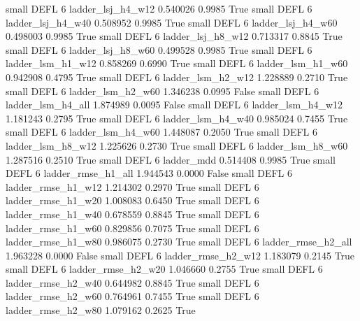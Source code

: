      small     DEFL                 6        ladder_lsj_h4_w12   0.540026      0.9985    True
     small     DEFL                 6        ladder_lsj_h4_w40   0.508952      0.9985    True
     small     DEFL                 6        ladder_lsj_h4_w60   0.498003      0.9985    True
     small     DEFL                 6        ladder_lsj_h8_w12   0.713317      0.8845    True
     small     DEFL                 6        ladder_lsj_h8_w60   0.499528      0.9985    True
     small     DEFL                 6        ladder_lsm_h1_w12   0.858269      0.6990    True
     small     DEFL                 6        ladder_lsm_h1_w60   0.942908      0.4795    True
     small     DEFL                 6        ladder_lsm_h2_w12   1.228889      0.2710    True
     small     DEFL                 6        ladder_lsm_h2_w60   1.346238      0.0995   False
     small     DEFL                 6        ladder_lsm_h4_all   1.874989      0.0095   False
     small     DEFL                 6        ladder_lsm_h4_w12   1.181243      0.2795    True
     small     DEFL                 6        ladder_lsm_h4_w40   0.985024      0.7455    True
     small     DEFL                 6        ladder_lsm_h4_w60   1.448087      0.2050    True
     small     DEFL                 6        ladder_lsm_h8_w12   1.225626      0.2730    True
     small     DEFL                 6        ladder_lsm_h8_w60   1.287516      0.2510    True
     small     DEFL                 6               ladder_mdd   0.514408      0.9985    True
     small     DEFL                 6       ladder_rmse_h1_all   1.944543      0.0000   False
     small     DEFL                 6       ladder_rmse_h1_w12   1.214302      0.2970    True
     small     DEFL                 6       ladder_rmse_h1_w20   1.008083      0.6450    True
     small     DEFL                 6       ladder_rmse_h1_w40   0.678559      0.8845    True
     small     DEFL                 6       ladder_rmse_h1_w60   0.829856      0.7075    True
     small     DEFL                 6       ladder_rmse_h1_w80   0.986075      0.2730    True
     small     DEFL                 6       ladder_rmse_h2_all   1.963228      0.0000   False
     small     DEFL                 6       ladder_rmse_h2_w12   1.183079      0.2145    True
     small     DEFL                 6       ladder_rmse_h2_w20   1.046660      0.2755    True
     small     DEFL                 6       ladder_rmse_h2_w40   0.644982      0.8845    True
     small     DEFL                 6       ladder_rmse_h2_w60   0.764961      0.7455    True
     small     DEFL                 6       ladder_rmse_h2_w80   1.079162      0.2625    True
